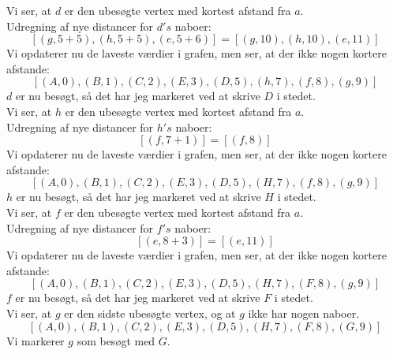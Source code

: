 \documentclass[a4paper,12pt]{article}
\begin{document}
Vi ser, at $d$ er den ubesøgte vertex med kortest afstand fra $a$.\\
Udregning af nye distancer for $d's$ naboer:
\[
[(g,5+5),(h,5+5),(e,5+6)] = [(g,10),(h,10),(e,11)]
\]
Vi opdaterer nu de laveste værdier i grafen, men ser, at der ikke nogen kortere afstande:
\[
[(A,0),(B,1),(C,2),(E,3),(D,5),(h,7),(f,8),(g,9)]
\]
$d$ er nu besøgt, så det har jeg markeret ved at skrive $D$ i stedet.\\

Vi ser, at $h$ er den ubesøgte vertex med kortest afstand fra $a$.\\
Udregning af nye distancer for $h's$ naboer:
\[
[(f,7+1)] = [(f,8)]
\]
Vi opdaterer nu de laveste værdier i grafen, men ser, at der ikke nogen kortere afstande:
\[
[(A,0),(B,1),(C,2),(E,3),(D,5),(H,7),(f,8),(g,9)]
\]
$h$ er nu besøgt, så det har jeg markeret ved at skrive $H$ i stedet.\\

Vi ser, at $f$ er den ubesøgte vertex med kortest afstand fra $a$.\\
Udregning af nye distancer for $f's$ naboer:
\[
[(e,8+3)] = [(e,11)]
\]
Vi opdaterer nu de laveste værdier i grafen, men ser, at der ikke nogen kortere afstande:
\[
[(A,0),(B,1),(C,2),(E,3),(D,5),(H,7),(F,8),(g,9)]
\]
$f$ er nu besøgt, så det har jeg markeret ved at skrive $F$ i stedet.\\

Vi ser, at $g$ er den sidste ubesøgte vertex, og at $g$ ikke har nogen naboer.\\
\[
[(A,0),(B,1),(C,2),(E,3),(D,5),(H,7),(F,8),(G,9)]
\]
Vi markerer $g$ som besøgt med $G$.

\subsection[]{}



\subsection[]{}



\subsection[]{}
\end{document}
